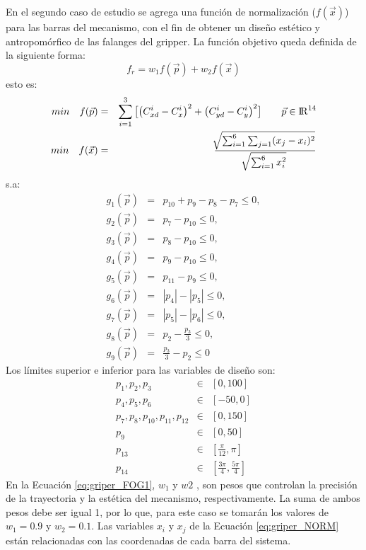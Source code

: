 En el segundo caso de estudio se agrega una función de normalización ($f(\vec{x})$) para las barras del mecanismo, con el fin de obtener un diseño  estético y antropomórfico de las falanges del gripper. La función objetivo queda definida de la siguiente forma:
\begin{equation}\label{eq:griper_FOG1}
  f_r= w_1f(\vec{p})+w_2f(\vec{x})
\end{equation}
esto es:
 \begin{eqnarray}\label{}
min\quad  f(\vec{p})&=&
\sum_{i=1}^{3}\big[\big(C^{i}_{xd}-C^{i}_{x} \big)^2 +\big(C^{i}_{yd}-C^{i}_{y} \big)^2\big] \qquad \vec{p} \in  {\rm I\!R}^{14} \\
min\quad  f(\vec{x})&=&\frac{\sqrt[]{\sum^6_{i=1}\sum_{j=1}(x_j-x_i)^2}}{\sqrt[]{\sum^6_{i=1}x^2_i}} \label{eq:griper_NORM}
\end{eqnarray}
s.a:
\begin{eqnarray}\label{eq:Restricciones griper2}
g_{1}(\vec{p})&=&p_{10}+ p_{9}-p_{8}-p_{7} \leq 0,\\
g_{2}(\vec{p})&=&p_{7}-p_{10} \leq 0,\\
g_{3}(\vec{p})&=&p_{8}-p_{10} \leq 0,\\
g_{4}(\vec{p})&=&p_{9}-p_{10} \leq 0,\\
g_{5}(\vec{p})&=&p_{11}-p_{9} \leq 0,\\
g_{6}(\vec{p})&=&|p_{4}|-|p_{5}| \leq 0,\\
g_{7}(\vec{p})&=&|p_{5}|-|p_{6}| \leq 0,\\
g_{8}(\vec{p})&=&p_{2}-\frac{p_3}{3} \leq 0,\\
g_{9}(\vec{p})&=&\frac{p_3}{3}-p_{2} \leq 0
\end{eqnarray}
Los límites superior e inferior para las variables de diseño son:
\begin{eqnarray}\label{eq:limites variables griper2}
p_1,p_2,p_3 & \in & \left[ 0,100\right] \\
p_4,p_5,p_6 & \in & \left[ -50,0\right] \\
p_7,p_8,p_{10},p_{11},p_{12} & \in & \left[ 0,150 \right] \\
p_9 & \in & \left[ 0,50\right] \\
p_{13} & \in & \left[ \frac{\pi}{12},\pi \right] \\
p_{14} & \in & \left[ \frac{3\pi}{4},\frac{5\pi}{4} \right]
\end{eqnarray}
En la Ecuación \ref{eq:griper_FOG1}, $w_1$ y $w2$ , son pesos que controlan la precisión de la trayectoria y la estética del mecanismo, respectivamente. La suma de ambos pesos debe ser igual 1, por lo que, para este caso se tomarán los valores de $w_1=0.9$ y $w_2=0.1$. Las variables $x_i$ y $x_j$ de la Ecuación \ref{eq:griper_NORM} están relacionadas con las coordenadas de cada barra del sistema.

